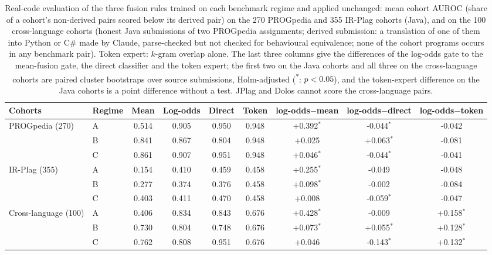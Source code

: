 \begin{table}[t]
\centering
\caption{Real-code evaluation of the three fusion rules trained on each benchmark regime and applied unchanged: mean cohort AUROC (share of a cohort's non-derived pairs scored below its derived pair) on the 270 PROGpedia and 355 IR-Plag cohorts (Java), and on the 100 cross-language cohorts (honest Java submissions of two PROGpedia assignments; derived submission: a translation of one of them into Python or C\# made by Claude, parse-checked but not checked for behavioural equivalence; none of the cohort programs occurs in any benchmark pair). Token expert: $k$-gram overlap alone. The last three columns give the differences of the log-odds gate to the mean-fusion gate, the direct classifier and the token expert; the first two on the Java cohorts and all three on the cross-language cohorts are paired cluster bootstraps over source submissions, Holm-adjusted (\textsuperscript{*}: $p<0.05$), and the token-expert difference on the Java cohorts is a point difference without a test. JPlag and Dolos cannot score the cross-language pairs.}
\label{tab:logit-real}
\scriptsize
\setlength{\tabcolsep}{3pt}
\begin{tabular}{ll|cccc|ccc}
\toprule
\textbf{Cohorts} & \textbf{Regime} & Mean & Log-odds & Direct & Token & log-odds$-$mean & log-odds$-$direct & log-odds$-$token \\
\midrule
PROGpedia (270) & A & 0.514 & 0.905 & 0.950 & 0.948 & +0.392$^{*}$ & -0.044$^{*}$ & -0.042 \\
 & B & 0.841 & 0.867 & 0.804 & 0.948 & +0.025 & +0.063$^{*}$ & -0.081 \\
 & C & 0.861 & 0.907 & 0.951 & 0.948 & +0.046$^{*}$ & -0.044$^{*}$ & -0.041 \\
\midrule
IR-Plag (355) & A & 0.154 & 0.410 & 0.459 & 0.458 & +0.255$^{*}$ & -0.049 & -0.048 \\
 & B & 0.277 & 0.374 & 0.376 & 0.458 & +0.098$^{*}$ & -0.002 & -0.084 \\
 & C & 0.403 & 0.411 & 0.470 & 0.458 & +0.008 & -0.059$^{*}$ & -0.047 \\
\midrule
Cross-language (100) & A & 0.406 & 0.834 & 0.843 & 0.676 & +0.428$^{*}$ & -0.009 & +0.158$^{*}$ \\
 & B & 0.730 & 0.804 & 0.748 & 0.676 & +0.073$^{*}$ & +0.055$^{*}$ & +0.128$^{*}$ \\
 & C & 0.762 & 0.808 & 0.951 & 0.676 & +0.046 & -0.143$^{*}$ & +0.132$^{*}$ \\
\bottomrule
\end{tabular}
\end{table}